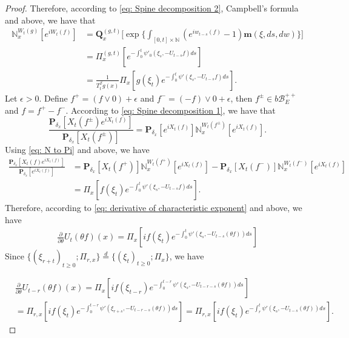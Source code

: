 \documentclass[12pt,oneside,english]{amsart}
\theoremstyle{plain}
\theoremstyle{definition}
\numberwithin{equation}{section}
\begin{document}
\begin{proof}
    Therefore, according to \eqref{eq: Spine decomposition 2}, Campbell's formula and above, we have that
\begin{align}
\label{eq: N to Pi}
    \mathbb N_x^{W_t(g)}[e^{i W_t(f)}]
    &=\mathbf Q_x^{(g,t)} \Big[\exp\Big\{\int_{[0,t]\times \mathbb N}(e^{i w_{t-s}(f)} - 1) \mathbf m(\xi, ds,dw)\Big\}\Big]
    \\&= \Pi_x^{(g,t)} [e^{-\int_0^t \psi'_0(\xi_s, -U_{t-s}f)ds}]
    \\&= \frac{1}{T_t^\beta g (x)} \Pi_x[ g(\xi_t) e^{-\int_0^t \psi'(\xi_s, -U_{t-s}f)ds} ].
\end{align}
    Let $\epsilon >0$.
    Define $f^+ = (f \vee 0) + \epsilon$ and $f^- = (-f) \vee 0 + \epsilon$, then $f^\pm \in b\mathscr B^{++}_E$ and $f = f^+ - f^-$.
    According to \eqref{eq: Spine decomposition 1}, we have that
\begin{equation}
    \frac{\mathbf P_{\delta_x}[X_t(f^{\pm})e^{i X_t(f)}]}{\mathbf P_{\delta_x}[X_t(f^{\pm})]}
    = \mathbf P_{\delta_x}[e^{i X_t(f)}] \mathbb N_x^{W_t(f^{\pm})}[e^{i X_t(f)}].
\end{equation}
    Using \eqref{eq: N to Pi} and above, we have
\begin{align}
    \frac{\mathbf P_{\delta_x}[X_t(f)e^{i X_t(f)}] }{\mathbf P_{\delta_x}[e^{i X_t(f)}]}
    &= \mathbf P_{\delta_x}[X_t(f^+)] \mathbb N_x^{W_t(f^+)} [e^{i X_t(f)}] - \mathbf P_{\delta_x}[X_t(f^-)]\mathbb N_x^{W_t(f^-)}[e^{i X_t(f)}]
    \\& = \Pi_x[ f(\xi_t) e^{- \int_0^t \psi'(\xi_s, -U_{t-s}f) ds}  ].
\end{align}
    Therefore, according to \eqref{eq: derivative of characteristic exponent} and above, we have
\begin{align}
    \frac{\partial}{\partial \theta} {U_t(\theta f)(x)}
    =  \Pi_x[ if(\xi_t) e^{ - \int_0^t \psi'(\xi_s, -U_{t-s}(\theta f)) ds} ]
\end{align}
    Since $\{(\xi_{r+t})_{t \geq 0}; \Pi_{r,x}\} \overset{d}{=} \{(\xi_{t})_{t\geq 0}; \Pi_{x}\} $, we have

\begin{align}
    &\frac{\partial}{\partial \theta} U_{t-r}(\theta f)( x)
    = \Pi_x[ i f(\xi_{t-r}) e^{-\int_0^{t-r} \psi'(\xi_s, -U_{t-r-s}(\theta f)) ds} ]
    \\&= \Pi_{r,x}[i f(\xi_t)e^{-\int_0^{t-r} \psi'(\xi_{r+s}, -U_{t-r-s}(\theta f)) ds} ]
    = \Pi_{r,x}[if(\xi_t)e^{-\int_r^t \psi'(\xi_{s}, -U_{t-s}(\theta f)) ds} ].
\end{align}


\end{proof}
\end{document}
